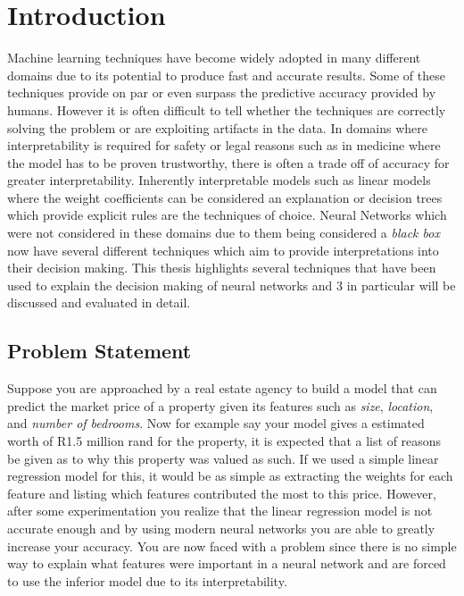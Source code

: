 \chapter{Introduction}

Machine learning techniques have become widely adopted in many different domains due to its potential to produce fast and accurate results. Some of these techniques provide on par or even surpass the predictive accuracy provided by humans. However it is often difficult to tell whether the techniques are correctly solving the problem or are exploiting artifacts in the data. In domains where interpretability is required for safety or legal reasons such as in medicine \cite{10.1145/2783258.2788613} where the model has to be proven trustworthy, there is often a trade off of accuracy for greater interpretability. Inherently interpretable models such as linear models where the weight coefficients can be considered an explanation or decision trees \cite{articleb} which provide explicit rules are the techniques of choice. Neural Networks which were not considered in these domains due to them being considered a \emph{black box} now have several different techniques which aim to provide interpretations into their decision making. This thesis highlights several techniques that have been used to explain the decision making of neural networks and 3 in particular will be discussed and evaluated in detail.

\section{Problem Statement} \label{sect-intro-problem}
Suppose you are approached by a real estate agency to build a model that can predict the market price of a property given its features such as \emph{size}, \emph{location}, and \emph{number of bedrooms}. Now for example say your model gives a estimated worth of R1.5 million rand for the property, it is expected that a list of reasons be given as to why this property was valued as such. If we used a simple linear regression model for this, it would be as simple as extracting the weights for each feature and listing which features contributed the most to this price. However, after some experimentation you realize that the linear regression model is not accurate enough and by using modern neural networks you are able to greatly increase your accuracy. You are now faced with a problem since there is no simple way to explain what features were important in a neural network and are forced to use the inferior model due to its interpretability.

